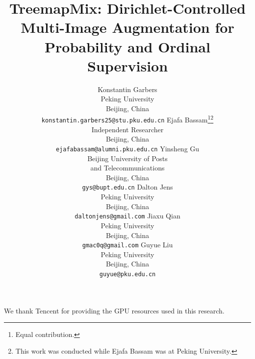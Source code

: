 \documentclass{article}
\title{TreemapMix: Dirichlet-Controlled Multi-Image Augmentation for Probability and Ordinal Supervision}
\author{%
  Konstantin Garbers\footnotemark[1] \\
  Peking University \\
  Beijing, China \\
  \texttt{konstantin.garbers25@stu.pku.edu.cn}
  \And
  Ejafa Bassam\thanks{Equal contribution.}\hspace{0.4em}\thanks{This work was conducted while Ejafa Bassam was at Peking University.} \\
  Independent Researcher \\
  Beijing, China \\
  \texttt{ejafabassam@alumni.pku.edu.cn}
  \AND
  Yinsheng Gu \\
  Beijing University of Posts \\
  and Telecommunications \\
  Beijing, China \\
  \texttt{gys@bupt.edu.cn}
  \And
  Dalton Jens \\
  Peking University \\
  Beijing, China \\
  \texttt{daltonjens@gmail.com}
  \AND
  Jiaxu Qian \\
  Peking University \\
  Beijing, China \\
  \texttt{gmac0q@gmail.com}
  \And
  Guyue Liu \\
  Peking University \\
  Beijing, China \\
  \texttt{guyue@pku.edu.cn}
}
\begin{document}
\maketitle







%


\begin{ack}
We thank Tencent for providing the GPU resources used in this research.
\end{ack}

\clearpage



\clearpage
\appendix


\clearpage

\end{document}
